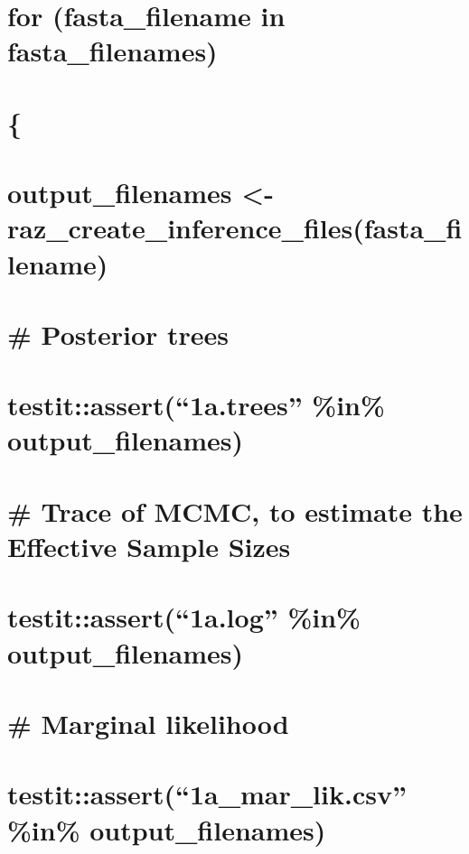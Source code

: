 \documentclass[]{article}
\begin{document}
\section{for (fasta\_filename in
fasta\_filenames)}\label{for-fasta_filename-in-fasta_filenames}

\section{\{}\label{section-3}

\section{output\_filenames \textless{}-
raz\_create\_inference\_files(fasta\_filename)}\label{output_filenames---raz_create_inference_filesfasta_filename}

\section{\# Posterior trees}\label{posterior-trees}

\section{\texorpdfstring{testit::assert(``1a.trees'' \%in\%
output\_filenames)}{testit::assert(1a.trees \%in\% output\_filenames)}}\label{testitassert1a.trees-in-output_filenames}

\section{\# Trace of MCMC, to estimate the Effective Sample
Sizes}\label{trace-of-mcmc-to-estimate-the-effective-sample-sizes}

\section{\texorpdfstring{testit::assert(``1a.log'' \%in\%
output\_filenames)}{testit::assert(1a.log \%in\% output\_filenames)}}\label{testitassert1a.log-in-output_filenames}

\section{\# Marginal likelihood}\label{marginal-likelihood}

\section{\texorpdfstring{testit::assert(``1a\_mar\_lik.csv'' \%in\%
output\_filenames)}{testit::assert(1a\_mar\_lik.csv \%in\% output\_filenames)}}\label{testitassert1a_mar_lik.csv-in-output_filenames}
\end{document}
